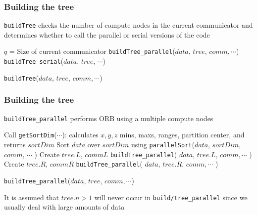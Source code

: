 \documentclass[usernames,dvipsnames]{beamer}
\begin{document}
\begin{frame}
	\frametitle{Building the tree}
	
	\texttt{buildTree} checks the number of compute nodes in the current communicator and determines whether to call the parallel or serial versions of the code
	
	\vspace{10pt}
	
	\begin{algorithm}[H]
		\begin{algorithmic}[1]
			\STATE $q$ = Size of current communicator
				\STATE \texttt{buildTree\_parallel}($data$, $tree$, $comm, \cdots$)
			\ELSE
				\STATE \texttt{buildTree\_serial}($data$, $tree$, $\cdots$)
			\ENDIF
		\end{algorithmic}
	\caption{\texttt{buildTree}($data$, $tree$, $comm, \cdots$)}
	\end{algorithm}
		
\end{frame}

\begin{frame}
	\frametitle{Building the tree}
	
	\texttt{buildTree\_parallel} performs ORB using a multiple compute nodes
	
	\vspace{10pt}
	
	\begin{algorithm}[H]
		\footnotesize
		\begin{algorithmic}[1]
			\STATE Call \texttt{getSortDim}($\cdots$): calculates $x,y,z$ mins, maxs, ranges, partition center, and returns $sortDim$
			\STATE Sort $data$ over $sortDim$ using \texttt{parallelSort}($data$, $sortDim$, $comm$, $\cdots$ )
				\STATE Create $tree.L$, $commL$
				\STATE \texttt{buildTree\_parallel}( $data$, $tree.L$, $comm, \cdots$ )
			\ELSE
				\STATE Create $tree.R$, $commR$
				\STATE \texttt{buildTree\_parallel}( $data$, $tree.R$, $comm, \cdots$ )
			\ENDIF
		\end{algorithmic}
		\caption{\texttt{buildTree\_parallel}($data$, $tree$, $comm, \cdots$)}
	\end{algorithm}
	
	\vspace{10pt}
	
	It is assumed that $tree.n > 1$ will never occur in \texttt{build/tree\_parallel} since we usually deal with large amounts of data
		
\end{frame}
\end{document}

